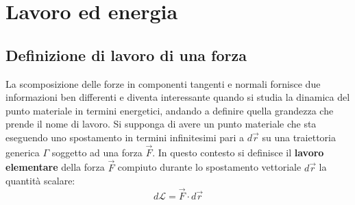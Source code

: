 \documentclass[10pt,a4paper]{book}
\begin{document}
\chapter{Lavoro ed energia}

\section{Definizione di lavoro di una forza}

La scomposizione delle forze in componenti tangenti e normali fornisce due informazioni ben differenti e diventa interessante quando si studia la dinamica del punto materiale in termini energetici, andando a definire quella grandezza che prende il nome di lavoro.
Si supponga di avere un punto materiale che sta eseguendo uno spostamento in termini infinitesimi pari a $d\vec{r}$ su una traiettoria generica $\Gamma$ soggetto ad una forza $\vec{F}$. In questo contesto si definisce il \textbf{lavoro elementare} della forza $\vec{F}$ compiuto durante lo spostamento vettoriale $d\vec{r}$ la quantità scalare:
\[
	\boxed{d\mathcal{L}=\vec{F}\cdot d\vec{r}}
\]
\end{document}
